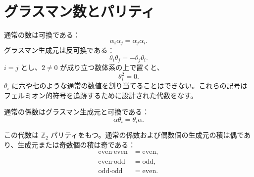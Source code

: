 \section{グラスマン数とパリティ}

通常の数は可換である：
\begin{equation}
\alpha_i\alpha_j=\alpha_j\alpha_i.
\end{equation}
グラスマン生成元は反可換である：
\begin{equation}
\theta_i\theta_j=-\theta_j\theta_i.
\end{equation}
\(i=j\) とし、\(2\neq0\) が成り立つ数体系の上で置くと、
\begin{equation}
\theta_i^2=0.
\end{equation}
\(\theta_i\) に六や七のような通常の数値を割り当てることはできない。これらの記号はフェルミオン的符号を追跡するために設計された代数をなす。

通常の係数はグラスマン生成元と可換である：
\begin{equation}
\alpha\theta_i=\theta_i\alpha.
\end{equation}

\begin{classroomqa}
\end{classroomqa}

この代数は \(\mathbb Z_2\) パリティをもつ。通常の係数および偶数個の生成元の積は偶であり、生成元または奇数個の積は奇である：
\begin{equation}
\begin{aligned}
\text{even}\cdot\text{even}&=\text{even},\\
\text{even}\cdot\text{odd}&=\text{odd},\\
\text{odd}\cdot\text{odd}&=\text{even}.
\end{aligned}
\end{equation}

\begin{classroomqa}
\end{classroomqa}

